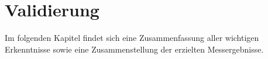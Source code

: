 \section{Validierung}
Im folgenden Kapitel findet sich eine Zusammenfassung aller wichtigen Erkenntnisse sowie eine Zusammenstellung der erzielten Messergebnisse. 
